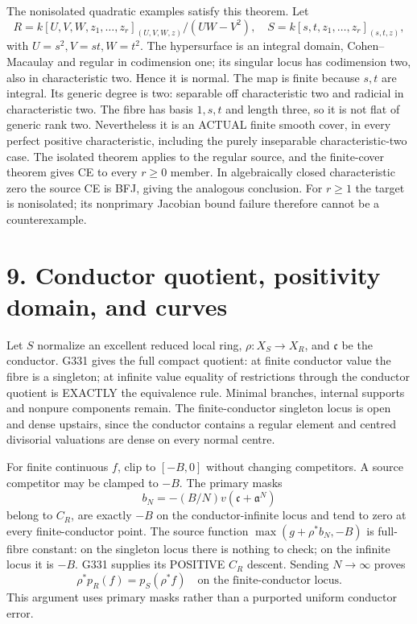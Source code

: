 \documentclass[11pt]{article}
\begin{document}
The nonisolated quadratic examples satisfy this theorem. Let
\[
R=k[U,V,W,z_1,\ldots,z_r]_{(U,V,W,z)}/(UW-V^2),
\quad S=k[s,t,z_1,\ldots,z_r]_{(s,t,z)},
\]
with \(U=s^2,V=st,W=t^2\). The hypersurface is an integral domain, Cohen--Macaulay and regular in codimension one; its singular locus has codimension two, also in characteristic two. Hence it is normal. The map is finite because \(s,t\) are integral. Its generic degree is two: separable off characteristic two and radicial in characteristic two. The fibre has basis \(1,s,t\) and length three, so it is not flat of generic rank two. Nevertheless it is an ACTUAL finite smooth cover, in every perfect positive characteristic, including the purely inseparable characteristic-two case. The isolated theorem applies to the regular source, and the finite-cover theorem gives CE to every \(r\ge0\) member. In algebraically closed characteristic zero the source CE is BFJ, giving the analogous conclusion. For \(r\ge1\) the target is nonisolated; its nonprimary Jacobian bound failure therefore cannot be a counterexample.

\section{9. Conductor quotient, positivity domain, and curves}

Let \(S\) normalize an excellent reduced local ring, \(\rho:X_S\to X_R\), and \(\mathfrak c\) be the conductor. G331 gives the full compact quotient: at finite conductor value the fibre is a singleton; at infinite value equality of restrictions through the conductor quotient is EXACTLY the equivalence rule. Minimal branches, internal supports and nonpure components remain. The finite-conductor singleton locus is open and dense upstairs, since the conductor contains a regular element and centred divisorial valuations are dense on every normal centre.

For finite continuous \(f\), clip to \([-B,0]\) without changing competitors. A source competitor may be clamped to \(-B\). The primary masks
\[
b_N=-(B/N)v(\mathfrak c+\mathfrak a^N)
\]
belong to \(C_R\), are exactly \(-B\) on the conductor-infinite locus and tend to zero at every finite-conductor point. The source function \(\max(g+\rho^*b_N,-B)\) is full-fibre constant: on the singleton locus there is nothing to check; on the infinite locus it is \(-B\). G331 supplies its POSITIVE \(C_R\) descent. Sending \(N\to\infty\) proves
\[
\rho^*p_R(f)=p_S(\rho^*f)
\quad\text{on the finite-conductor locus}.
\]
This argument uses primary masks rather than a purported uniform conductor error.
\end{document}
